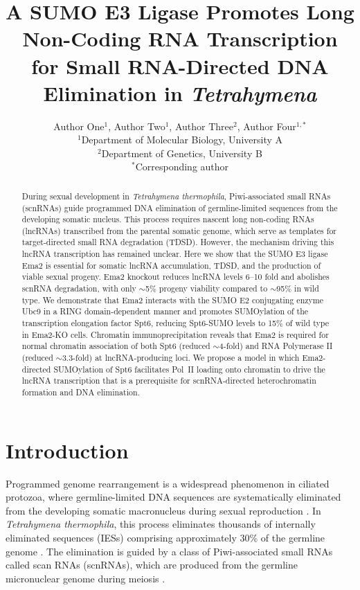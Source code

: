 \documentclass[11pt]{article}
\title{A SUMO E3 Ligase Promotes Long Non-Coding RNA Transcription for Small RNA-Directed DNA Elimination in \textit{Tetrahymena}}
\author{
  Author One$^{1}$, Author Two$^{1}$, Author Three$^{2}$, Author Four$^{1,*}$ \\
  $^{1}$Department of Molecular Biology, University A \\
  $^{2}$Department of Genetics, University B \\
  $^{*}$Corresponding author
}
\date{}
\begin{document}
\maketitle

\begin{abstract}
During sexual development in \textit{Tetrahymena thermophila}, Piwi-associated small RNAs (scnRNAs) guide programmed DNA elimination of germline-limited sequences from the developing somatic nucleus. This process requires nascent long non-coding RNAs (lncRNAs) transcribed from the parental somatic genome, which serve as templates for target-directed small RNA degradation (TDSD). However, the mechanism driving this lncRNA transcription has remained unclear. Here we show that the SUMO E3 ligase Ema2 is essential for somatic lncRNA accumulation, TDSD, and the production of viable sexual progeny. Ema2 knockout reduces lncRNA levels 6--10 fold and abolishes scnRNA degradation, with only $\sim$5\% progeny viability compared to $\sim$95\% in wild type. We demonstrate that Ema2 interacts with the SUMO E2 conjugating enzyme Ubc9 in a RING domain-dependent manner and promotes SUMOylation of the transcription elongation factor Spt6, reducing Spt6-SUMO levels to 15\% of wild type in Ema2-KO cells. Chromatin immunoprecipitation reveals that Ema2 is required for normal chromatin association of both Spt6 (reduced $\sim$4-fold) and RNA Polymerase II (reduced $\sim$3.3-fold) at lncRNA-producing loci. We propose a model in which Ema2-directed SUMOylation of Spt6 facilitates Pol~II loading onto chromatin to drive the lncRNA transcription that is a prerequisite for scnRNA-directed heterochromatin formation and DNA elimination.
\end{abstract}

\section{Introduction}

Programmed genome rearrangement is a widespread phenomenon in ciliated protozoa, where germline-limited DNA sequences are systematically eliminated from the developing somatic macronucleus during sexual reproduction \citep{chalker2011,betermier2014}. In \textit{Tetrahymena thermophila}, this process eliminates thousands of internally eliminated sequences (IESs) comprising approximately 30\% of the germline genome \citep{mochizuki2010}. The elimination is guided by a class of Piwi-associated small RNAs called scan RNAs (scnRNAs), which are produced from the germline micronuclear genome during meiosis \citep{mochizuki2002,aronica2008}.
\end{document}
